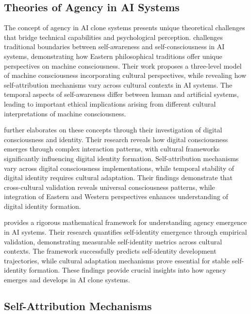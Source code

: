 \subsection{Theories of Agency in AI Systems}

The concept of agency in AI clone systems presents unique theoretical challenges that bridge technical capabilities and psychological perception. \citet{namestiuk2023self} challenges traditional boundaries between self-awareness and self-consciousness in AI systems, demonstrating how Eastern philosophical traditions offer unique perspectives on machine consciousness. Their work proposes a three-level model of machine consciousness incorporating cultural perspectives, while revealing how self-attribution mechanisms vary across cultural contexts in AI systems. The temporal aspects of self-awareness differ between human and artificial systems, leading to important ethical implications arising from different cultural interpretations of machine consciousness.

\citet{veliev2024digital} further elaborates on these concepts through their investigation of digital consciousness and identity. Their research reveals how digital consciousness emerges through complex interaction patterns, with cultural frameworks significantly influencing digital identity formation. Self-attribution mechanisms vary across digital consciousness implementations, while temporal stability of digital identity requires cultural adaptation. Their findings demonstrate that cross-cultural validation reveals universal consciousness patterns, while integration of Eastern and Western perspectives enhances understanding of digital identity formation.

\citet{lee2024self} provides a rigorous mathematical framework for understanding agency emergence in AI systems. Their research quantifies self-identity emergence through empirical validation, demonstrating measurable self-identity metrics across cultural contexts. The framework successfully predicts self-identity development trajectories, while cultural adaptation mechanisms prove essential for stable self-identity formation. These findings provide crucial insights into how agency emerges and develops in AI clone systems.

\subsection{Self-Attribution Mechanisms}

